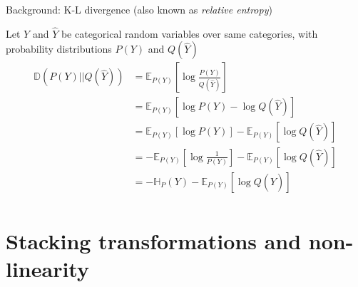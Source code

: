 \documentclass[12pt,aspectratio=169,handout]{beamer}
\begin{document}
\begin{frame}{Background: K-L divergence (also known as \emph{relative entropy})}
	
Let $Y$ and $\hat{Y}$ be categorical random variables over same categories, with probability distributions $P(Y)$ and $Q(\hat{Y})$
\begin{align*}
	\mathbb{D}(P(Y) || Q(\hat{Y})) &= \mathbb{E}_{P(Y)} \left[ \log \frac{P(Y)}{Q(\hat{Y})} \right] \\
	&= \mathbb{E}_{P(Y)} \left[ \log P(Y) - \log Q(\hat{Y}) \right] \\
	&= \mathbb{E}_{P(Y)} \left[ \log P(Y)\right] - \mathbb{E}_{P(Y)} \left[ \log Q(\hat{Y}) \right] \\
	&= - \mathbb{E}_{P(Y)} \left[ \log \frac{1}{P(Y)}\right] - \mathbb{E}_{P(Y)} \left[ \log Q(\hat{Y}) \right] \\
	&= - \mathbb{H}_{P} (Y)  - \mathbb{E}_{P(Y)} \left[ \log Q(\hat{Y}) \right] \\
\end{align*}
	
\end{frame}



\section{Stacking transformations and non-linearity}
\end{document}
